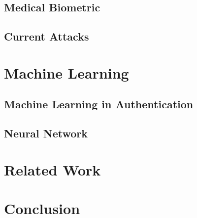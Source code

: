 \documentclass[a4paper,12pt]{article}
\begin{document}
\subsection{Medical Biometric}
\subsection{Current Attacks}

\section{Machine Learning}
\subsection{Machine Learning in Authentication}
\subsection{Neural Network}

\section{Related Work}

\section{Conclusion}

\printbibliography
\end{document}
